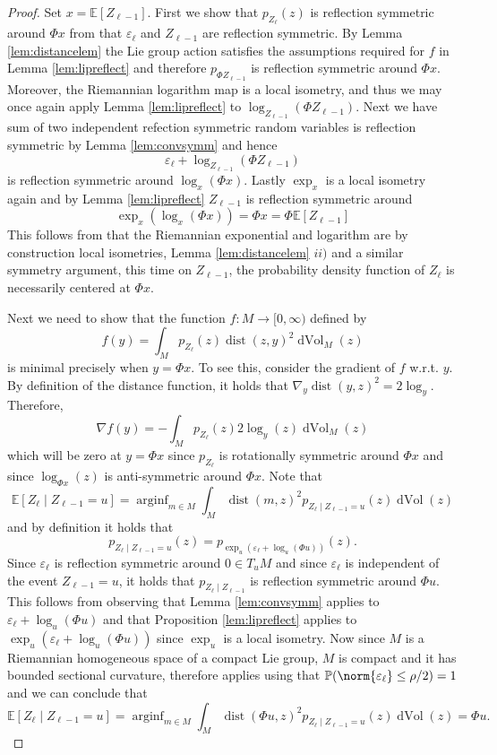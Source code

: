 \documentclass[12pt,a4paper]{article}
\theoremstyle{definition}
\theoremstyle{remark}
\DeclareMathOperator*{\arginf}{arginf}
\DeclareMathOperator{\dist}{dist}
\DeclareMathOperator{\dVol}{dVol}
\begin{document}
\begin{proof}
Set $x=\mathbb{E}[Z_{\ell-1}]$. First we show that $p_{Z_{\ell}} (z)$ is reflection symmetric around $\Phi x$ from that $\varepsilon_\ell$ and $Z_{\ell-1}$ are reflection symmetric. By Lemma \ref{lem:distancelem} the Lie group action satisfies the assumptions required for $f$ in Lemma \ref{lem:lipreflect} and therefore $p_{\Phi Z_{\ell-1}}$ is reflection symmetric around $\Phi x$. Moreover, the Riemannian logarithm map is a local isometry, and thus we may once again apply Lemma \ref{lem:lipreflect} to $\log_{Z_{\ell-1}}(\Phi Z_{\ell-1})$. Next we have sum of two independent refection symmetric random variables is reflection symmetric by Lemma \ref{lem:convsymm} and hence
\[
\varepsilon_\ell + \log_{Z_{\ell-1}}(\Phi Z_{\ell-1})
\]
is reflection symmetric around $\log_x(\Phi x)$. Lastly $\exp_x$ is a local isometry again and by Lemma \ref{lem:lipreflect} $Z_{\ell-1}$ is reflection symmetric around
\[
\exp_x(\log_x(\Phi x)) =\Phi x =\Phi \mathbb{E}[Z_{\ell-1}]
\]
This follows from that the Riemannian exponential and logarithm are by construction local isometries, Lemma \ref{lem:distancelem} $ii)$ and a similar symmetry argument, this time on $Z_{\ell-1}$, the probability density function of $Z_\ell$ is necessarily centered at $\Phi x$.

Next we need to show that the function $f:M\rightarrow [0,\infty)$ defined by
\[
f(y) = \int_M p_{Z_\ell}(z) \dist(z,y)^2 \dVol_M(z)
\]
is minimal precisely when $y= \Phi x$. To see this, consider the gradient of $f$  w.r.t. $y$. By definition of the distance function, it holds that $\nabla_y\dist(y,z)^2 = 2\log_y$. Therefore,
\[
\nabla f(y)= -\int_M p_{Z_\ell}(z) 2 \log_{y}(z)  \dVol_M(z)
\]
which will be zero at $y= \Phi x$ since $p_{Z_\ell}$ is rotationally symmetric around $\Phi x$ and since $\log_{\Phi x}(z)$ is anti-symmetric around $\Phi x$. Note that
\[
\mathbb{E}[Z_\ell\mid Z_{\ell-1}=u] = \arginf_{m\in M} \int_M \dist(m,z)^2 p_{Z_\ell\mid Z_{\ell-1}=u}(z) \dVol(z)
\]
and by definition it holds that
\[
p_{Z_\ell\mid Z_{\ell -1}=u}(z)=p_{\exp_u(\varepsilon_\ell +\log_{u}(\Phi u))}(z).
\]
Since $\varepsilon_\ell$ is reflection symmetric around $0\in T_u M$ and since $\varepsilon_\ell$ is independent of the event $Z_{\ell-1}=u$, it holds that $p_{Z_\ell\mid Z_{\ell-1}}$ is reflection symmetric around $\Phi u$. This follows from observing that Lemma \ref{lem:convsymm} applies to $\varepsilon_\ell + \log_u(\Phi u)$ and that Proposition \ref{lem:lipreflect} applies to $\exp_u(\varepsilon_\ell + \log_u(\Phi u))$ since $\exp_u$ is a local isometry. Now since $M$ is a Riemannian homogeneous space of a compact Lie group, $M$ is compact and it has bounded sectional curvature, therefore \cite[Theorem 1.2]{karcher1977riemannian} applies using that $\mathbb{P} (\norm{\varepsilon_\ell} \leq \rho/2)=1$ and we can conclude that
\[
\mathbb{E}[Z_{\ell}\mid Z_{\ell-1}=u] =\arginf_{m\in M} \int_{M} \dist(\Phi u,z)^2 p_{Z_\ell\mid Z_{\ell -1}=u}(z) \dVol(z) = \Phi u.
\]


\end{proof}
\end{document}
